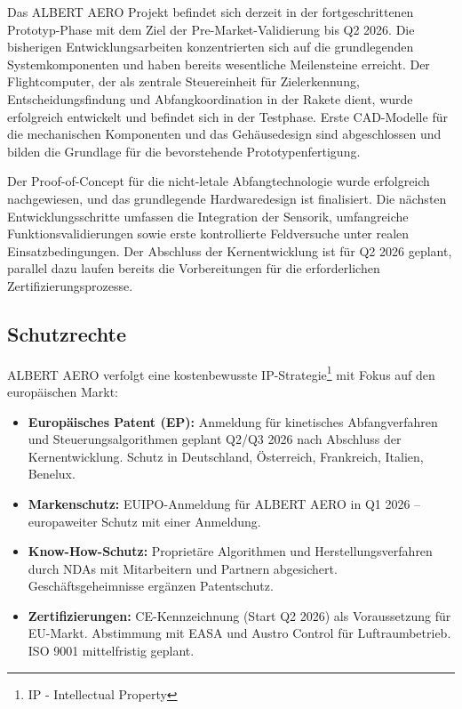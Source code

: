 \documentclass[11pt,a4paper]{article}
\begin{document}
Das ALBERT AERO Projekt befindet sich derzeit in der fortgeschrittenen Prototyp-Phase mit dem Ziel der 
Pre-Market-Validierung bis Q2 2026. Die bisherigen Entwicklungsarbeiten konzentrierten sich auf die 
grundlegenden Systemkomponenten und haben bereits wesentliche Meilensteine erreicht. Der Flightcomputer, 
der als zentrale Steuereinheit für Zielerkennung, Entscheidungsfindung und Abfangkoordination in der Rakete dient, wurde 
erfolgreich entwickelt und befindet sich in der Testphase. Erste CAD-Modelle für die mechanischen Komponenten 
und das Gehäusedesign sind abgeschlossen und bilden die Grundlage für die bevorstehende Prototypenfertigung.

Der Proof-of-Concept für die nicht-letale Abfangtechnologie wurde erfolgreich nachgewiesen, und das 
grundlegende Hardwaredesign ist finalisiert. Die nächsten Entwicklungsschritte umfassen die Integration 
der Sensorik, umfangreiche Funktionsvalidierungen sowie erste kontrollierte Feldversuche unter realen 
Einsatzbedingungen. Der Abschluss der Kernentwicklung ist für Q2 2026 geplant, parallel dazu laufen bereits 
die Vorbereitungen für die erforderlichen Zertifizierungsprozesse.

\subsection{Schutzrechte}

ALBERT AERO verfolgt eine kostenbewusste IP-Strategie\footnote{IP - Intellectual Property} mit Fokus auf den europäischen Markt:

\begin{itemize}
    \item \textbf{Europäisches Patent (EP):} Anmeldung für kinetisches Abfangverfahren und Steuerungsalgorithmen geplant Q2/Q3 2026 nach Abschluss der Kernentwicklung. Schutz in Deutschland, Österreich, Frankreich, Italien, Benelux.
    
    \item \textbf{Markenschutz:} EUIPO-Anmeldung für ALBERT AERO in Q1 2026 – europaweiter Schutz mit einer Anmeldung.
    
    \item \textbf{Know-How-Schutz:} Proprietäre Algorithmen und Herstellungsverfahren durch NDAs mit Mitarbeitern und Partnern abgesichert. Geschäftsgeheimnisse ergänzen Patentschutz.
    
    \item \textbf{Zertifizierungen:} CE-Kennzeichnung (Start Q2 2026) als Voraussetzung für EU-Markt. Abstimmung mit EASA und Austro Control für Luftraumbetrieb. ISO 9001 mittelfristig geplant.
\end{itemize}
\end{document}
